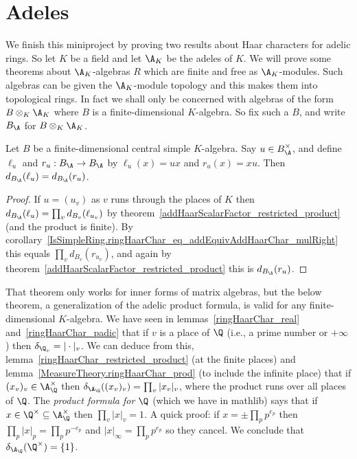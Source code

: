 \section{Adeles}

We finish this miniproject by proving two results about Haar characters for
adelic rings. So let $K$ be a field and let $\A_K$ be the adeles of $K$.
We will prove some theorems about $\A_K$-algebras $R$ which are finite
and free as $\A_K$-modules. Such algebras can be given the $\A_K$-module topology
and this makes them into topological rings. In fact we shall only be concerned
with algebras of the form $B\otimes_K\A_K$ where $B$ is a finite-dimensional
$K$-algebra. So fix such a $B$, and write $B_{\A}$ for $B\otimes_K\A_K$.

\begin{theorem}
  \label{addHaarScalarFactor.left_mul_eq_right_mul}
  Let $B$ be a finite-dimensional central simple $K$-algebra.
  Say $u\in B_{\A}^\times$, and define $\ell_u$ and $r_u:B_{\A}\to B_{\A}$ by
  $\ell_u(x)=ux$ and $r_u(x)=xu$. Then $d_{B_{\A}}(\ell_u)=d_{B_{\A}}(r_u)$.
\end{theorem}
\begin{proof} If $u=(u_v)$ as $v$ runs through the places of $K$ then
  $d_{B_{\A}}(\ell_u)=\prod_v d_{B_v}(\ell_{u_v})$ by
  theorem~\ref{addHaarScalarFactor_restricted_product} (and the product is finite).
  By corollary~\ref{IsSimpleRing.ringHaarChar_eq_addEquivAddHaarChar_mulRight}
  this equals $\prod_v d_{B_v}(r_{u_v})$, and again by
  theorem~\ref{addHaarScalarFactor_restricted_product} this is $d_{B_{\A}}(r_u)$.
\end{proof}

That theorem only works for inner forms of matrix algebras, but the below theorem,
a generalization of the adelic product formula, is valid for any finite-dimensional
$K$-algebra.
We have seen in lemmas~\ref{ringHaarChar_real} and~\ref{ringHaarChar_padic}
  that if $v$ is a place of $\Q$ (i.e., a prime
  number or $+\infty$) then $\delta_{\Q_v}=|\cdot|_v$.
  We can deduce from this, lemma~\ref{ringHaarChar_restricted_product} (at the finite places)
  and lemma~\ref{MeasureTheory.ringHaarChar_prod} (to include the infinite place) that if $(x_v)_v\in\A_{\Q}^\times$
  then $\delta_{\A_{\Q}}((x_v)_v)=\prod_v|x_v|_v$, where the product
  runs over all places of $\Q$.
  The \emph{product formula for $\Q$} (which we have in mathlib) says
  that if $x\in\Q^\times\subseteq\A_{\Q}^\times$ then $\prod_v|x|_v=1.$
  A quick proof: if $x=\pm\prod_pp^{e_p}$ then $\prod_p|x|_p=\prod_pp^{-e_p}$
  and $|x|_\infty=\prod_pp^{e_p}$ so they cancel. We conclude that $\delta_{\A_{\Q}}(\Q^\times)=\{1\}$.

